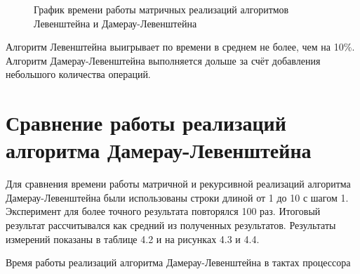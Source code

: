\documentclass[12pt, a4paper]{report}
\begin{document}
	\begin{figure}[ht!]
		\caption{График времени работы матричных реализаций алгоритмов Левенштейна и Дамерау-Левенштейна}
	\end{figure}
	
	Алгоритм Левенштейна выигрывает по времени в среднем не более, чем на 10\%. Алгоритм Дамерау-Левенштейна выполняется дольше за счёт добавления небольшого количества операций.
   
	\section{Сравнение работы реализаций алгоритма Дамерау-Левенштейна}
	Для сравнения времени работы матричной и рекурсивной реализаций алгоритма Дамерау-Левенштейна были использованы строки длиной от 1 до 10 с шагом 1. Эксперимент для более точного результата повторялся 100 раз. Итоговый результат рассчитывался как средний из полученных результатов. Результаты измерений показаны в таблице 4.2 и на рисунках 4.3 и 4.4.\\
	
	\begin{table}[ht!]
		\begin{center}
			\caption{Время работы реализаций алгоритма Дамерау-Левенштейна в тактах процессора}
		\end{center}
	\end{table}
\end{document}
